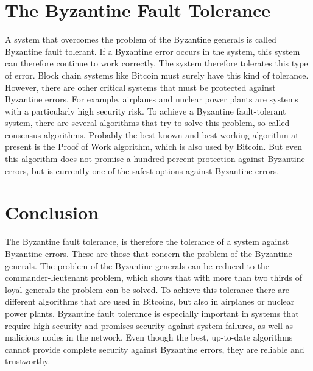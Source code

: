 \documentclass[12pt]{article}
\begin{document}
\section{The Byzantine Fault Tolerance}
A system that overcomes the problem of the Byzantine generals is called Byzantine fault tolerant. If a Byzantine error occurs in the system, this system can therefore continue to work correctly. The system therefore tolerates this type of error.
Block chain systems like Bitcoin must surely have this kind of tolerance. However, there are other critical systems that must be protected against Byzantine errors. For example, airplanes and nuclear power plants are systems with a particularly high security risk.\cite{blockchainwelt}\newline
To achieve a Byzantine fault-tolerant system, there are several algorithms that try to solve this problem, so-called consensus algorithms. Probably the best known and best working algorithm at present is the Proof of Work algorithm, which is also used by Bitcoin. But even this algorithm does not promise a hundred percent protection against Byzantine errors, but is currently one of the safest options against Byzantine errors.\cite{binance academy}


%
%
\section{Conclusion}
The Byzantine fault tolerance, is therefore the tolerance of a system against Byzantine errors. These are those that concern the problem of the Byzantine generals.
The problem of the Byzantine generals can be reduced to the commander-lieutenant problem, which shows that with more than two thirds of loyal generals the problem can be solved.\newline
To achieve this tolerance there are different algorithms that are used in Bitcoins, but also in airplanes or nuclear power plants.\newline
Byzantine fault tolerance is especially important in systems that require high security and promises security against system failures, as well as malicious nodes in the network. Even though the best, up-to-date algorithms cannot provide complete security against Byzantine errors, they are reliable and trustworthy.
\end{document}
